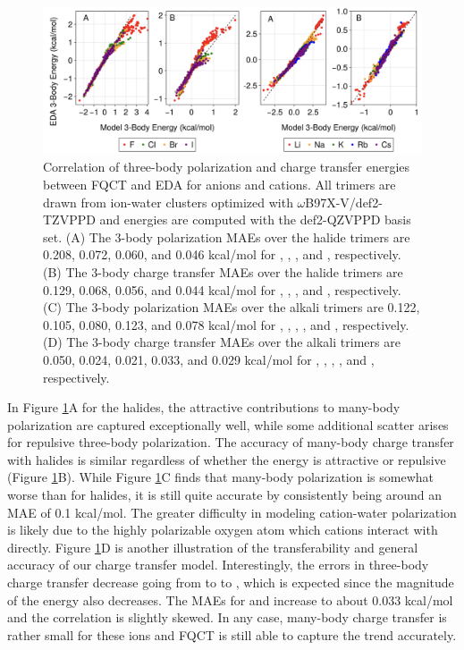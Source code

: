 \documentclass[journal=jctcce,manuscript=article]{achemso}
\begin{document}
\begin{figure}[h]
  \includegraphics*[width=\textwidth]{figures/three_body_pol_and_ct_ions.png}
  \caption{Correlation of three-body polarization and charge transfer energies between FQCT and EDA for anions and cations. All trimers are drawn from ion-water clusters optimized with $\omega$B97X-V/def2-TZVPPD and energies are computed with the def2-QZVPPD basis set. (A) The 3-body polarization MAEs over the halide trimers are 0.208, 0.072, 0.060, and 0.046 kcal/mol
  for , , , and , respectively. (B) The 3-body charge transfer MAEs over
  the halide trimers are 0.129, 0.068, 0.056, and 0.044 kcal/mol
  for , , , and , respectively. (C) The 3-body polarization MAEs over the alkali trimers are 0.122, 0.105, 0.080, 0.123, and 0.078 kcal/mol for , , , , and ,
  respectively. (D) The 3-body charge transfer MAEs over the alkali trimers are
  0.050, 0.024, 0.021, 0.033, and 0.029 kcal/mol for , , , , and ,
  respectively.
}
  \label{fig:Pol_CT_ions}
\end{figure}

In Figure \ref{fig:Pol_CT_ions}A for the halides, the attractive contributions to many-body polarization are captured exceptionally well, while some additional scatter arises for repulsive three-body polarization. The accuracy of many-body charge transfer with halides is similar regardless of whether the energy is attractive or repulsive (Figure \ref{fig:Pol_CT_ions}B). While Figure \ref{fig:Pol_CT_ions}C finds that many-body polarization is somewhat worse than for halides, it is still quite accurate by consistently being around an MAE of 0.1 kcal/mol. The greater difficulty in modeling cation-water polarization is likely due to the highly polarizable oxygen atom which cations interact with directly. Figure \ref{fig:Pol_CT_ions}D is another illustration of the transferability and general accuracy of our charge transfer model. Interestingly, the errors in three-body charge transfer decrease going from  to  to , which is expected since the magnitude of the energy also decreases. The MAEs for  and  increase to about 0.033 kcal/mol and the correlation is slightly skewed. In any case, many-body charge transfer is rather small for these ions and FQCT is still able to capture the trend accurately.
\end{document}
